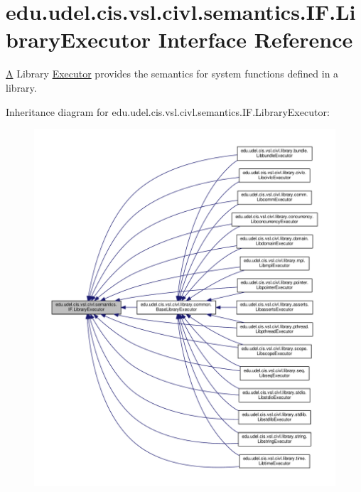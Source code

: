 \hypertarget{interfaceedu_1_1udel_1_1cis_1_1vsl_1_1civl_1_1semantics_1_1IF_1_1LibraryExecutor}{}\section{edu.\+udel.\+cis.\+vsl.\+civl.\+semantics.\+I\+F.\+Library\+Executor Interface Reference}
\label{interfaceedu_1_1udel_1_1cis_1_1vsl_1_1civl_1_1semantics_1_1IF_1_1LibraryExecutor}


\hyperlink{structA}{A} Library \hyperlink{interfaceedu_1_1udel_1_1cis_1_1vsl_1_1civl_1_1semantics_1_1IF_1_1Executor}{Executor} provides the semantics for system functions defined in a library.  




Inheritance diagram for edu.\+udel.\+cis.\+vsl.\+civl.\+semantics.\+I\+F.\+Library\+Executor\+:
\nopagebreak
\begin{figure}[H]
\begin{center}
\leavevmode
\includegraphics[width=350pt]{interfaceedu_1_1udel_1_1cis_1_1vsl_1_1civl_1_1semantics_1_1IF_1_1LibraryExecutor__inherit__graph}
\end{center}
\end{figure}
